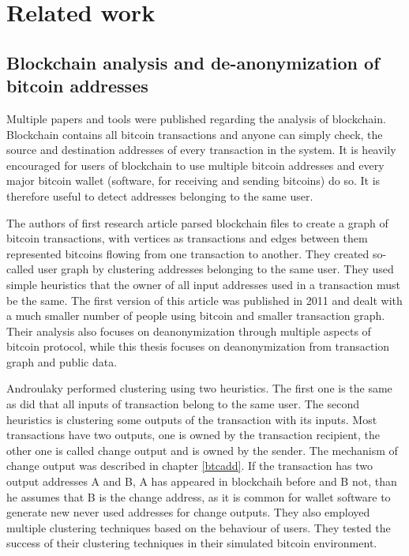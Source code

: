 \documentclass[
  digital, %
  table,   %
  lof,     %
  lot,     %
  oneside
]{fithesis3}
\begin{document}
\chapter{Related work}
\section{Blockchain analysis and de-anonymization of bitcoin addresses}

Multiple papers and tools were published regarding the analysis of blockchain.
Blockchain contains all bitcoin transactions and anyone can simply check,
the source and destination addresses of every transaction in the system.
It is heavily encouraged for users of blockchain to use multiple bitcoin addresses
 and every major bitcoin wallet (software, for receiving and sending bitcoins) do so.
 It is therefore useful to detect addresses belonging to the same user.
 
The authors of first research article \parencite{reid2013analysis}
 parsed blockchain files to create a graph of bitcoin transactions, with vertices as transactions
 and edges between them represented bitcoins flowing from one transaction to another.
 They created so-called user graph by clustering addresses belonging to the same user.
 They used simple heuristics that the owner of all input addresses used in a transaction must be the same. The first version of this article  
was published in 2011 and dealt with a much smaller number of people using bitcoin and smaller transaction graph.
Their analysis also focuses on deanonymization through multiple aspects of bitcoin protocol,
while this thesis focuses on deanonymization from transaction graph and public data.

Androulaky \parencite{androulaki2013evaluating} performed clustering using two heuristics.
The first one is the same as \parencite{reid2013analysis} did that all inputs of transaction
belong to the same user. The second heuristics is clustering some outputs of the transaction with its inputs.
Most transactions have two outputs, one is owned by the transaction recipient,
the other one is called change output and is owned by
the sender. The mechanism of change output was described in chapter \ref{btcadd}.
If the transaction has two output addresses A and B, A has appeared in blockchaih
before and B not, than he assumes that B is the change address, as it is common
for wallet software to generate new never used addresses for change outputs.
They also employed multiple clustering techniques based on the behaviour of users.
 They tested the success of their clustering techniques in their simulated bitcoin 
 environment.
\end{document}
